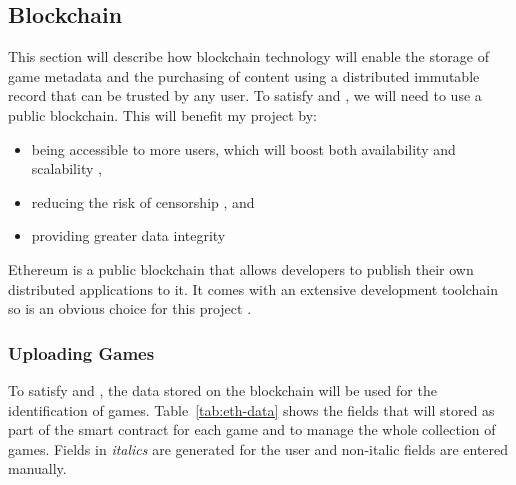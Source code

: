 
\subsection{Blockchain}\label{subsec:design-con-eth}

This section will describe how blockchain technology will enable the storage of game metadata and the purchasing of content using a distributed immutable record that can be trusted by any user. 
\x
To satisfy  and , we will need to use a public blockchain. This will benefit my project by:
\vspace{2mm}
\begin{itemize}
  \item being accessible to more users, which will boost both availability and scalability ,
  \item reducing the risk of censorship , and
  \item providing greater data integrity 
\end{itemize}

\newparagraph Ethereum is a public blockchain that allows developers to publish their own distributed applications to it. It comes with an extensive development toolchain so is an obvious choice for this project .

\subsubsection*{Uploading Games}
\label{subsubsec:eth-data}

To satisfy  and , the data stored on the blockchain will be used for the identification of games. Table~\ref{tab:eth-data} shows the fields that will stored as part of the smart contract for each game and to manage the whole collection of games. Fields in \textit{italics} are generated for the user and non-italic fields are entered manually.

